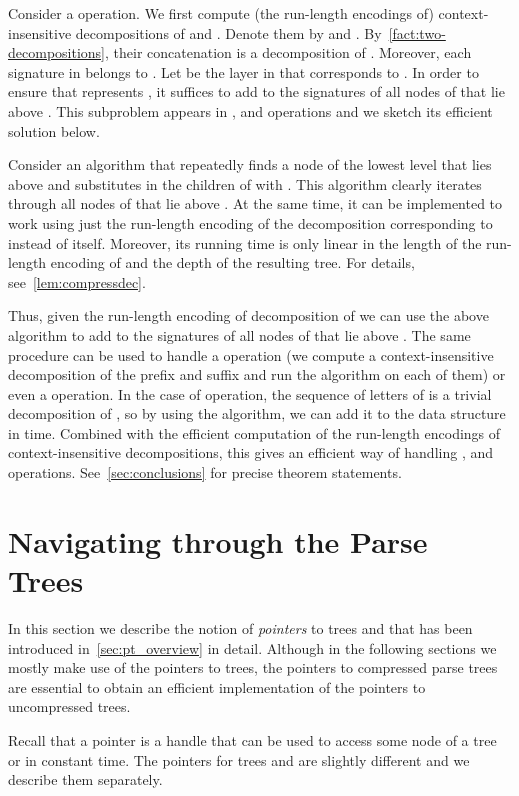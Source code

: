 \documentclass[a4paper]{article}
\theoremstyle{remark}
\begin{document}
Consider a  operation.
We first compute (the run-length encodings of) context-insensitive decompositions of  and .
Denote them by  and .
By~\cref{fact:two-decompositions}, their concatenation  is a decomposition of .
Moreover, each signature in  belongs to .
Let  be the layer in  that corresponds to .
In order to ensure that  represents , it suffices to add to  the signatures of all nodes of  that lie above .
This subproblem appears in ,  and  operations and we sketch its efficient solution below.

Consider an algorithm that repeatedly finds a node  of the lowest level that lies above  and substitutes in  the children of  with .
This algorithm clearly iterates through all nodes of  that lie above .
At the same time, it can be implemented to work using just the run-length encoding of the decomposition  corresponding to  instead of  itself.
Moreover, its running time is only linear in the length of the run-length encoding of  and the depth of the resulting tree. 
For details, see~\cref{lem:compressdec}.

Thus, given the run-length encoding of decomposition of  we can use the above algorithm to add to  the signatures of all nodes of  that lie above .
The same procedure can be used to handle a  operation (we compute a context-insensitive decomposition of the prefix and suffix and run the algorithm on each of them) or even a  operation.
In the case of  operation, the sequence of letters of  is a trivial decomposition of , so by using the algorithm, we can add it to the data structure in  time.
Combined with the efficient computation of the run-length encodings of context-insensitive decompositions, this gives an efficient way of handling ,  and  operations.
See~\cref{sec:conclusions} for precise theorem statements.

\section{Navigating through the Parse Trees}\label{sec:pointers}
In this section we describe the notion of \emph{pointers} to trees  and  that has been introduced in~\cref{sec:pt_overview} in detail.
Although in the following sections we mostly make use of the pointers
to  trees, the pointers to compressed parse trees
are essential to obtain an efficient implementation
of the pointers to uncompressed trees.

Recall that a pointer is a handle that can be used to access some node of a tree  or  in constant time.
The pointers for trees  and  are slightly different and we describe them separately.
\end{document}
